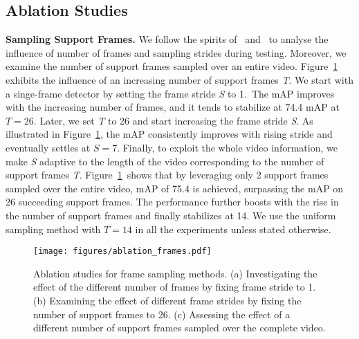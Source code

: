 \documentclass[10pt,twocolumn,letterpaper]{article}
\begin{document}
\subsection{Ablation Studies}
\noindent \textbf{ Sampling Support Frames.} We follow the spirits of~\cite{wu2019sequence} and~\cite{gong2021temporal} to analyse the influence of number of frames and sampling strides during testing. Moreover, we examine the number of support frames sampled over an entire video. Figure~\ref{fig:frame_sampling}\color{red}{(a)} \color{black} exhibits the influence of an increasing number of support frames \textit{T}. We start with a singe-frame detector by setting the frame stride \textit{S} to 1.~The mAP improves with the increasing number of frames, and it tends to stabilize at 74.4 mAP at $T=26$. Later, we set \textit{T} to 26 and start increasing the frame stride \textit{S}. As illustrated in Figure~\ref{fig:frame_sampling}\color{red}{(b)}\color{black}, the mAP consistently improves with rising stride and eventually settles at $S=7$. Finally, to exploit the whole video information, we make \textit{S} adaptive to the length of the video corresponding to the number of support frames \textit{T}. Figure~\ref{fig:frame_sampling}\color{red}{(c)}\color{black}~shows that by leveraging only 2 support frames sampled over the entire video, mAP of 75.4 is achieved, surpassing the mAP on 26 succeeding support frames. The performance further boosts with the rise in the number of support frames and finally stabilizes at 14. We use the uniform sampling method with $T=14$ in all the experiments unless stated otherwise.

\begin{figure}
\begin{center}
\texttt{[image: figures/ablation\_frames.pdf]}
\caption{Ablation studies for frame sampling methods. (a) Investigating the effect of the different number of frames by fixing frame stride to 1. (b) Examining the effect of different frame strides by fixing the number of support frames to 26. (c) Assessing the effect of a different number of support frames sampled over the complete video.}
\label{fig:frame_sampling}
\end{center}
\vspace{-20pt}
\end{figure}
\end{document}
